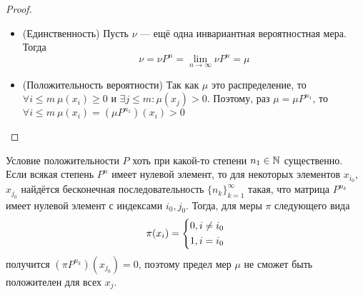 \begin{proof}
\begin{itemize}
		\item (Единственность) Пусть $\nu$ --- ещё одна инвариантная вероятностная мера. Тогда 
		\[
			\nu = \nu P^n = \lim_{n \to \infty} \nu P^n = \mu
		\]
		
		\item (Положительность вероятности) Так как $\mu$ это распределение, то $\forall i \le m\ \mu(x_i) \ge 0$ и $\exists j \le m \colon \mu(x_j) > 0$. Поэтому, раз $\mu = \mu P^{n_1}$, то $\forall i \le m\ \mu(x_i) = (\mu P^{n_1})(x_i) > 0$
	\end{itemize}
\end{proof}

\begin{note}
	Условие положительности $P$ хоть при какой-то степени $n_1 \in \mathbb{N}$ существенно. Если всякая степень $P^n$ имеет нулевой элемент, то для некоторых элементов $x_{i_0}$, $x_{j_0}$ найдётся бесконечная последовательность $\{n_k\}_{k = 1}^\infty$ такая, что матрица $P^{n_k}$ имеет нулевой элемент с индексами $i_0, j_0$. Тогда, для меры $\pi$ следующего вида
	\[
		\pi(x_i) = \left\{\begin{aligned}
			&{0, i \neq i_0}
			\\
			&{1, i = i_0}
		\end{aligned}\right.
	\]
	получится $(\pi P^{n_k})(x_{j_0}) = 0$, поэтому предел мер $\mu$ не сможет быть положителен для всех $x_j$.
\end{note}